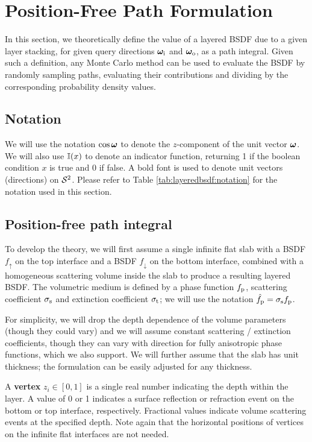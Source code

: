 \section{Position-Free Path Formulation}
\label{sec:layeredbsdf:pathformulation}

In this section, we theoretically define the value of a layered BSDF due to a given layer stacking, for given query directions $\bm\omega_\mathrm{i}$ and $\bm\omega_\mathrm{o}$, as a path integral. Given such a definition, any Monte Carlo method can be used to evaluate the BSDF by randomly sampling paths, evaluating their contributions and dividing by the corresponding probability density values.

\subsection{Notation}

We will use the notation $\cos \bm\omega$ to denote the $z$-component of the unit vector $\bm\omega$. We will also use $\mathbb{I}(x)$ to denote an indicator function, returning 1 if the boolean condition $x$ is true and 0 if false. A bold font is used to denote unit vectors (directions) on $\mathcal{S}^2$. Please refer to Table \ref{tab:layeredbsdf:notation} for the notation used in this section.



\subsection{Position-free path integral}

To develop the theory, we will first assume a single infinite flat slab with a BSDF $f_\uparrow$ on the top interface and a BSDF $f_\downarrow$ on the bottom interface, combined with a homogeneous scattering volume inside the slab to produce a resulting layered BSDF. The volumetric medium is defined by a phase function $f_\mathrm{p}$, scattering coefficient $\sigma_\mathrm{s}$ and extinction coefficient $\sigma_\mathrm{t}$; we will use the notation $\hat f_\mathrm{p} = \sigma_\mathrm{s} f_\mathrm{p}$.

For simplicity, we will drop the depth dependence of the volume parameters (though they could vary) and we will assume constant scattering / extinction coefficients, though they can vary with direction for fully anisotropic phase functions, which we also support. We will further assume that the slab has unit thickness; the formulation can be easily adjusted for any thickness.

A {\bf vertex} $z_i \in [0, 1]$ is a single real number indicating the depth within the layer. A value of 0 or 1 indicates a surface reflection or refraction event on the bottom or top interface, respectively. Fractional values indicate volume scattering events at the specified depth. Note again that the horizontal positions of vertices on the infinite flat interfaces are not needed.

